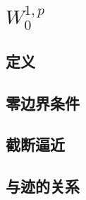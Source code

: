 \section{\texorpdfstring{\(W_0^{1,p}\)}{W₀(1,p)}}
\label{b1:sec:2202}


\subsection{定义}
\label{b1:subsec:220201}

\subsection{零边界条件}
\label{b1:subsec:220202}

\subsection{截断逼近}
\label{b1:subsec:220203}

\subsection{与迹的关系}
\label{b1:subsec:220204}


